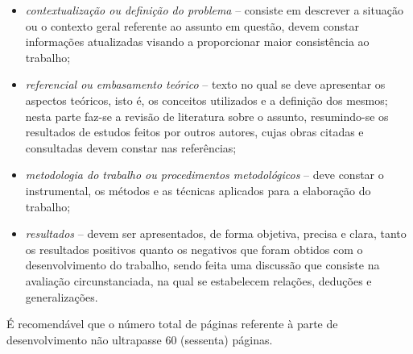 \begin{itemize}
   \item \textit{contextualização ou definição do problema} -- consiste em
   descrever a situação ou o contexto geral referente ao assunto em questão,
   devem constar informações atualizadas visando a proporcionar maior
   consistência ao trabalho;
   \item \textit{referencial ou embasamento teórico} -- texto no qual se deve
   apresentar os aspectos teóricos, isto é, os conceitos utilizados e a
   definição dos mesmos; nesta parte faz-se a revisão de literatura sobre o
   assunto, resumindo-se os resultados de estudos feitos por outros autores,
   cujas obras citadas e consultadas devem constar nas referências;
   \item \textit{metodologia do trabalho ou procedimentos metodológicos} -- deve
   constar o instrumental, os métodos e as técnicas aplicados para a elaboração
   do trabalho;
   \item \textit{resultados} -- devem ser apresentados, de forma objetiva,
   precisa e clara, tanto os resultados positivos quanto os negativos que foram
   obtidos com o desenvolvimento do trabalho, sendo feita uma discussão que
   consiste na avaliação circunstanciada, na qual se estabelecem relações,
   deduções e generalizações.
\end{itemize}

É recomendável que o número total de páginas referente à parte de
 desenvolvimento não ultrapasse 60 (sessenta) páginas.